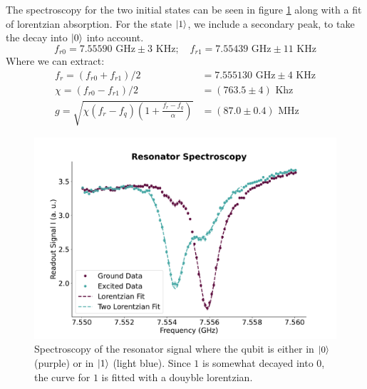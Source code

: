  The spectroscopy for the two initial states can be seen in figure \ref{fig:spectroscopy_resonator} along with a fit of lorentzian absorption. For the state $\ket{1}$, we include a secondary peak, to take the decay into $\ket{0}$ into account.
 \begin{equation}
     f_{r0} = 7.55590 \text{ GHz} \pm 3 \text{ KHz} ;\quad f_{r1} =  7.55439 \text{ GHz} \pm 11 \text{ KHz}
 \end{equation}
Where we can extract:
\begin{align}
    f_r  = (f_{r0} + f_{r1}) / 2 &= 7.555130 \text{ GHz} \pm 4 \text{ KHz} \\
    \chi = (f_{r0} - f_{r1}) / 2 &= (763.5 \pm 4) \text{ Khz}  \label{eq:dispersive_shift}\\
    g    = \sqrt{\chi (f_r - f_q)\left(1 + \frac{f_r - f_q}{\alpha}\right)} &= (87.0 \pm 0.4) \text{ MHz}
\end{align}

\begin{figure}
    \centering
    \includegraphics{Calibrations/Figures/Resonator Spectroscopy.pdf}
    \caption{Spectroscopy of the resonator signal where the qubit is either in $\ket{0}$ (purple) or in $\ket{1}$ (light blue). Since $1$ is somewhat decayed into $0$, the curve for $1$ is fitted with a douyble lorentzian. }
    \label{fig:spectroscopy_resonator}
\end{figure}

